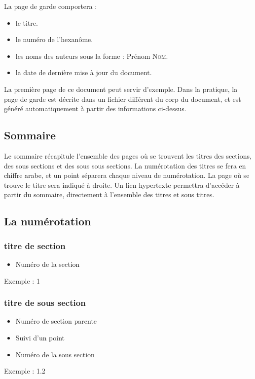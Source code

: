     La page de garde comportera :
    \begin{itemize}
      \item le titre.
      \item le numéro de l'hexanôme.
      \item les noms des auteurs sous la forme : Prénom \textsc{Nom}.
      \item la date de dernière mise à jour du document.
    \end{itemize}
    La première page de ce document peut servir d'exemple.
    Dans la pratique, la page de garde est décrite dans un fichier différent du corp du document, et est généré automatiquement à partir des informations ci-dessus.

\subsection{Sommaire}
  
   Le sommaire récapitule l'ensemble des pages où se trouvent les titres des sections, des sous sections et des sous sous sections.
   La numérotation des titres se fera en chiffre arabe, et un point séparera chaque niveau de numérotation.
   La page où se trouve le titre sera indiqué à droite.
   Un lien hypertexte permettra d'accéder à partir du sommaire, directement à l'ensemble des titres et sous titres.

\subsection{La numérotation}
   
   \subsubsection{titre de section}
   \begin{itemize}
        \item Numéro de la section
   \end{itemize}
        Exemple : 1

   \subsubsection{titre de sous section}
   \begin{itemize}
      \item Numéro de section parente
      \item Suivi d'un point
      \item Numéro de la sous section
   \end{itemize}
        Exemple : 1.2


